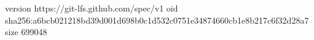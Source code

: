 version https://git-lfs.github.com/spec/v1
oid sha256:a6bcb021218bd39d001d698b0c1d532c0751e34874660cb1e8b217c6f32d28a7
size 699048
